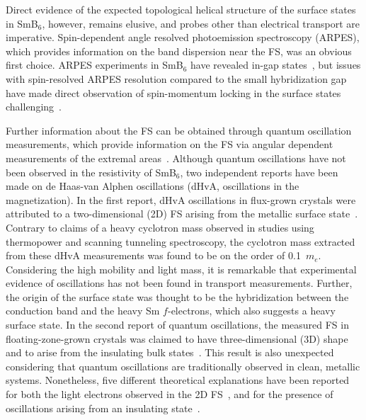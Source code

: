 \documentclass[twocolumn,preprintnumbers,amsmath,amssymb]{revtex4}
\begin{document}
Direct evidence of the expected topological helical structure of the surface states in SmB$_{6}$, however, remains elusive, and probes other than electrical
 transport are imperative.
Spin-dependent angle resolved photoemission spectroscopy (ARPES), which provides information on the band dispersion near the FS, was an obvious first choice.
ARPES experiments in SmB$_6$ have revealed in-gap states~\cite{Neupane2013,Xu2013,Jiang2013}, but issues with spin-resolved ARPES resolution compared to the small 
hybridization gap have made direct 
observation of spin-momentum locking in the surface states challenging~\cite{Neupane2013}.




Further information about the FS can be obtained through quantum oscillation measurements,
which provide information on the FS via angular dependent measurements of the extremal areas~\cite{Shoenberg1984}.
Although quantum oscillations have not been observed in the resistivity of SmB$_6$, two independent reports have been made on de Haas-van Alphen oscillations (dHvA, oscillations in the magnetization).
In the first report, dHvA oscillations in flux-grown crystals were attributed to a two-dimensional (2D) FS arising from the metallic surface state~\cite{Li2014}.
Contrary to claims of a heavy cyclotron mass observed in studies using thermopower and scanning tunneling spectroscopy\cite{Luo2015,Hamidian2018}, the cyclotron mass extracted from these dHvA measurements was found to be on the order of 0.1~$m_e$.
Considering the high mobility and light mass, it is remarkable that experimental evidence of oscillations has not been found in transport measurements.
Further, the origin of the surface state was thought to be the hybridization between the conduction band and the heavy Sm $f$-electrons, which also suggests a heavy surface 
state.
In the second report of quantum oscillations, the measured FS in floating-zone-grown crystals was claimed to have three-dimensional (3D) shape and to arise from the insulating 
bulk states~\cite{Tan2015}.
This result is also unexpected considering that quantum oscillations are traditionally observed in clean, metallic systems.
Nonetheless, five different theoretical explanations have been reported for both the light electrons observed in the 2D FS~\cite{Alexandrov2015}, and for the presence of 
oscillations arising from an insulating state~\cite{Knolle2015, Erten2016, Pal2018, Shen2018}.
\end{document}
